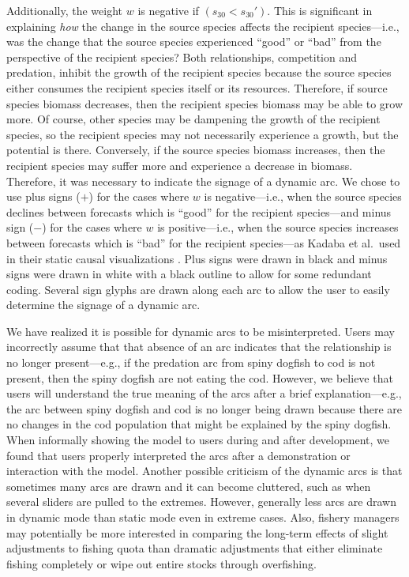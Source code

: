 Additionally, the weight $w$ is negative if $(s_{30} < s_{30}')$.  This is significant in explaining \textit{how} the change in the source species affects the recipient species---i.e., was the change that the source species experienced ``good'' or ``bad'' from the perspective of the recipient species?  Both relationships, competition and predation, inhibit the growth of the recipient species because the source species either consumes the recipient species itself or its resources.  Therefore, if source species biomass decreases, then the recipient species biomass may be able to grow more.  Of course, other species may be dampening the growth of the recipient species, so the recipient species may not necessarily experience a growth, but the potential is there.  Conversely, if the source species biomass increases, then the recipient species may suffer more and experience a decrease in biomass.  Therefore, it was necessary to indicate the signage of a dynamic arc.  We chose to use plus signs ($+$) for the cases where $w$ is negative---i.e., when the source species declines between forecasts which is ``good'' for the recipient species---and minus sign ($-$) for the cases where $w$ is positive---i.e., when the source species increases between forecasts which is ``bad'' for the recipient species---as Kadaba et al.\ used in their static causal visualizations \cite{kadaba2007}.  Plus signs were drawn in black and minus signs were drawn in white with a black outline to allow for some redundant coding.  Several sign glyphs are drawn along each arc to allow the user to easily determine the signage of a dynamic arc.

We have realized it is possible for dynamic arcs to be misinterpreted.  Users may incorrectly assume that that absence of an arc indicates that the relationship is no longer present---e.g., if the predation arc from spiny dogfish to cod is not present, then the spiny dogfish are not eating the cod.  However, we believe that users will understand the true meaning of the arcs after a brief explanation---e.g., the arc between spiny dogfish and cod is no longer being drawn because there are no changes in the cod population that might be explained by the spiny dogfish.  When informally showing the model to users during and after development, we found that users properly interpreted the arcs after a demonstration or interaction with the model.  Another possible criticism of the dynamic arcs is that sometimes many arcs are drawn and it can become cluttered, such as when several sliders are pulled to the extremes.  However, generally less arcs are drawn in dynamic mode than static mode even in extreme cases.  Also, fishery managers may potentially be more interested in comparing the long-term effects of slight adjustments to fishing quota than dramatic adjustments that either eliminate fishing completely or wipe out entire stocks through overfishing.

